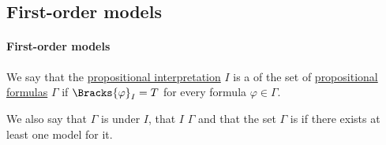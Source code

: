 \subsection{First-order models}\label{subsec:first_order_models}

\paragraph{First-order models}

\begin{definition}\label{def:propositional_model}
  We say that the \hyperref[def:propositional_valuation/interpretation]{propositional interpretation} \( I \) is a  of the set of \hyperref[def:propositional_syntax/formula]{propositional formulas} \( \Gamma \) if \( \Bracks{\varphi}_I = T \) for every formula \( \varphi \in \Gamma \).

  We also say that \( \Gamma \) is  under \( I \), that \( I \)  \( \Gamma \) and that the set \( \Gamma \) is  if there exists at least one model for it.
\end{definition}

